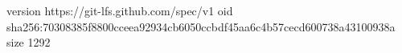 version https://git-lfs.github.com/spec/v1
oid sha256:70308385f8800cceea92934cb6050ccbdf45aa6c4b57cecd600738a43100938a
size 1292
